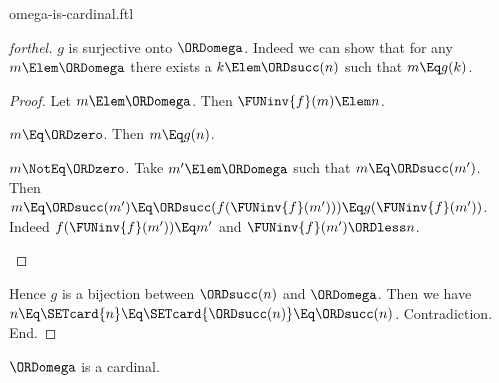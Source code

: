 \documentclass{stex}
\begin{document}
\begin{smodule}{omega-is-cardinal.ftl}
\begin{proof}[forthel]
    $g$ is surjective onto $\ORDomega$.
    Indeed we can show that for any $m \Elem \ORDomega$ there exists a $k \Elem \ORDsucc(n)$ such that $m \Eq g(k)$.
    \begin{proof}
      Let $m \Elem \ORDomega$.
      Then $\FUNinv{f}(m) \Elem n$.

      \begin{case}{$m \Eq \ORDzero$.}
        Then $m \Eq g(n)$.
      \end{case}

      \begin{case}{$m \NotEq \ORDzero$.}
        Take $m' \Elem \ORDomega$ such that $m \Eq \ORDsucc(m')$.
        Then $m
          \Eq \ORDsucc(m')
          \Eq \ORDsucc(f(\FUNinv{f}(m')))
          \Eq g(\FUNinv{f}(m'))$.
        Indeed $f(\FUNinv{f}(m')) \Eq m'$ and $\FUNinv{f}(m') \ORDless n$.
      \end{case}
    \end{proof}

    Hence $g$ is a bijection between $\ORDsucc(n)$ and $\ORDomega$.
    Then we have $n
      \Eq \SETcard{n}
      \Eq \SETcard{\ORDsucc(n)}
      \Eq \ORDsucc(n)$.
    Contradiction.
  End.
\end{proof}

\begin{corollary}[forthel]
  $\ORDomega$ is a cardinal.
\end{corollary}
\end{smodule}
\end{document}
